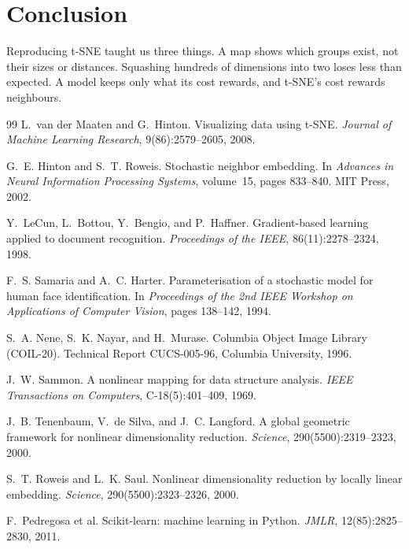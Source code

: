\documentclass{article}
\begin{document}
\section{Conclusion}
\label{sec:conclusion}
Reproducing t-SNE taught us three things. A map shows which groups exist, not their sizes or distances. Squashing hundreds of dimensions into two loses less than expected. A model keeps only what its cost rewards, and t-SNE's cost rewards neighbours.

\begin{thebibliography}{99}
L.~van der Maaten and G.~Hinton.
\newblock Visualizing data using t-{SNE}.
\newblock \emph{Journal of Machine Learning Research}, 9(86):2579--2605, 2008.

G.~E. Hinton and S.~T. Roweis.
\newblock Stochastic neighbor embedding.
\newblock In \emph{Advances in Neural Information Processing Systems}, volume~15, pages 833--840. MIT Press, 2002.

Y.~LeCun, L.~Bottou, Y.~Bengio, and P.~Haffner.
\newblock Gradient-based learning applied to document recognition.
\newblock \emph{Proceedings of the IEEE}, 86(11):2278--2324, 1998.

F.~S. Samaria and A.~C. Harter.
\newblock Parameterisation of a stochastic model for human face identification.
\newblock In \emph{Proceedings of the 2nd IEEE Workshop on Applications of Computer Vision}, pages 138--142, 1994.

S.~A. Nene, S.~K. Nayar, and H.~Murase.
\newblock Columbia Object Image Library ({COIL}-20).
\newblock Technical Report CUCS-005-96, Columbia University, 1996.

J.~W. Sammon.
\newblock A nonlinear mapping for data structure analysis.
\newblock \emph{IEEE Transactions on Computers}, C-18(5):401--409, 1969.

J.~B. Tenenbaum, V.~de Silva, and J.~C. Langford.
\newblock A global geometric framework for nonlinear dimensionality reduction.
\newblock \emph{Science}, 290(5500):2319--2323, 2000.

S.~T. Roweis and L.~K. Saul.
\newblock Nonlinear dimensionality reduction by locally linear embedding.
\newblock \emph{Science}, 290(5500):2323--2326, 2000.

 F.~Pedregosa et al. Scikit-learn: machine learning in Python. \emph{JMLR}, 12(85):2825--2830, 2011.


\end{thebibliography}
\end{document}
